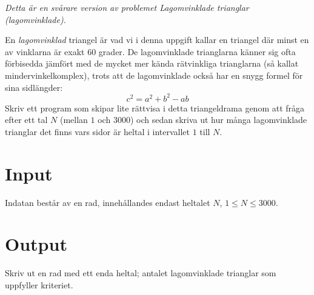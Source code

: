 \emph{Detta är en svårare version av problemet Lagomvinklade trianglar (lagomvinklade).}

En \emph{lagomvinklad} triangel är vad vi i denna uppgift kallar en triangel där minst en av vinklarna är exakt 60 grader. De lagomvinklade trianglarna känner sig ofta förbisedda jämfört med de mycket mer kända rätvinkliga trianglarna (så kallat mindervinkelkomplex), trots att de lagomvinklade också har en snygg formel för sina sidlängder:
\begin{equation*}
	c^2 = a^2 + b^2 - ab
\end{equation*}
Skriv ett program som skipar lite rättvisa i detta triangeldrama genom att fråga efter ett tal $N$ (mellan $1$ och $3000$) och sedan skriva ut hur många lagomvinklade trianglar det finns vars sidor är heltal i intervallet $1$ till $N$.

\section*{Input}
Indatan består av en rad, innehållandes endast heltalet $N$, $1 \leq N \leq 3000$.

\section*{Output}
Skriv ut en rad med ett enda heltal; antalet lagomvinklade trianglar som uppfyller kriteriet.
